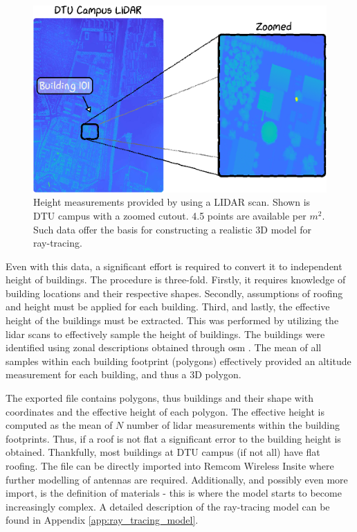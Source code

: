 \begin{figure}
    \centering
    \includegraphics[width=\textwidth]{chapters/part_pathloss/figures/LIDAR_example.eps}
    \caption{Height measurements provided by \cite{kortforsyningen} using a LIDAR scan. Shown is DTU campus with a zoomed cutout. 4.5 points are available per $m^2$. Such data offer the basis for constructing a realistic 3D model for ray-tracing.}
    \label{fig:lidar_data_example}
\end{figure}

Even with this data, a significant effort is required to convert it to independent height of buildings. The procedure is three-fold. Firstly, it requires knowledge of building locations and their respective shapes. Secondly, assumptions of roofing and height must be applied for each building. Third, and lastly, the effective height of the buildings must be extracted. This was performed by utilizing the \gls{lidar} scans to effectively sample the height of buildings. The buildings were identified using zonal descriptions obtained through \gls{osm} \cite{OpenstreetMapWiki}. The mean of all samples within each building footprint (polygons) effectively provided an altitude measurement for each building, and thus a 3D polygon.

The exported file contains polygons, thus buildings and their shape with coordinates and the effective height of each polygon. The effective height is computed as the mean of $N$ number of \gls{lidar} measurements within the building footprints. Thus, if a roof is not flat a significant error to the building height is obtained. Thankfully, most buildings at DTU campus (if not all) have flat roofing. The file can be directly imported into Remcom Wireless Insite where further modelling of antennas are required. Additionally, and possibly even more import, is the definition of materials - this is where the model starts to become increasingly complex. A detailed description of the ray-tracing model can be found in Appendix \ref{app:ray_tracing_model}.

